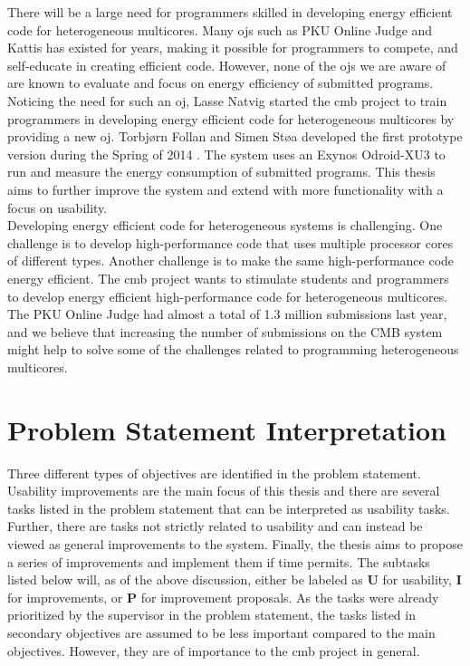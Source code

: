 There will be a large need for programmers skilled in developing energy efficient code for heterogeneous multicores. Many \glspl{oj} such as PKU Online Judge \cite{PKU} and Kattis \cite{KATTIS} has existed for years, making it possible for programmers to compete, and self-educate in creating efficient code. However, none of the \glspl{oj} we are aware of are known to evaluate and focus on energy efficiency of submitted programs. Noticing the need for such an \gls{oj}, Lasse Natvig started the \gls{cmb} project to train programmers in developing energy efficient code for heterogeneous multicores by providing a new \gls{oj}. Torbjørn Follan and Simen Støa developed the first prototype version during the Spring of 2014 \cite{mt:T&S}. The system uses an Exynos Odroid-XU3 \cite{XU3} to run and measure the energy consumption of submitted programs. This thesis aims to further improve the system and extend with more functionality with a focus on usability. \\

Developing energy efficient code for heterogeneous systems is challenging. One challenge is to develop high-performance code that uses multiple processor cores of different types. Another challenge is to make the same high-performance code energy efficient. The \gls{cmb} project wants to stimulate students and programmers to develop energy efficient high-performance code for heterogeneous multicores. The PKU Online Judge \cite{PKU} had almost a total of 1.3 million submissions last year, and we believe that increasing the number of submissions on the CMB system might help to solve some of the challenges related to programming heterogeneous multicores. \\

\clearpage

\section{Problem Statement Interpretation}
\label{sec:ps-inter}
Three different types of objectives are identified in the problem statement. Usability improvements are the main focus of this thesis and there are several tasks listed in the problem statement that can be interpreted as usability tasks. Further, there are tasks not strictly related to usability and can instead be viewed as general improvements to the system. Finally, the thesis aims to propose a series of improvements and implement them if time permits. The subtasks listed below will, as of the above discussion, either be labeled as \textbf{U} for usability, \textbf{I} for improvements, or \textbf{P} for improvement proposals. As the tasks were already prioritized by the supervisor in the problem statement, the tasks listed in secondary objectives are assumed to be less important compared to the main objectives. However, they are of importance to the \gls{cmb} project in general.

